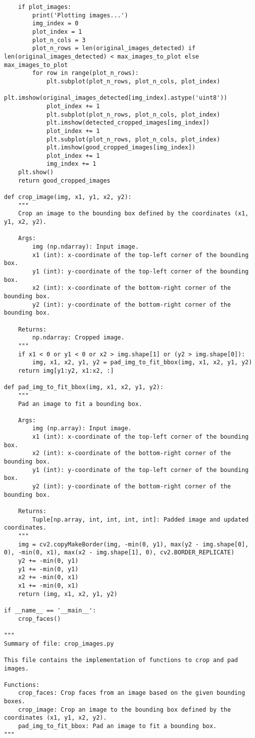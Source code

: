 \begin{verbatim}
    if plot_images:
        print('Plotting images...')
        img_index = 0
        plot_index = 1
        plot_n_cols = 3
        plot_n_rows = len(original_images_detected) if len(original_images_detected) < max_images_to_plot else max_images_to_plot
        for row in range(plot_n_rows):
            plt.subplot(plot_n_rows, plot_n_cols, plot_index)
            plt.imshow(original_images_detected[img_index].astype('uint8'))
            plot_index += 1
            plt.subplot(plot_n_rows, plot_n_cols, plot_index)
            plt.imshow(detected_cropped_images[img_index])
            plot_index += 1
            plt.subplot(plot_n_rows, plot_n_cols, plot_index)
            plt.imshow(good_cropped_images[img_index])
            plot_index += 1
            img_index += 1
    plt.show()
    return good_cropped_images

def crop_image(img, x1, y1, x2, y2):
    """
    Crop an image to the bounding box defined by the coordinates (x1, y1, x2, y2).

    Args:
        img (np.ndarray): Input image.
        x1 (int): x-coordinate of the top-left corner of the bounding box.
        y1 (int): y-coordinate of the top-left corner of the bounding box.
        x2 (int): x-coordinate of the bottom-right corner of the bounding box.
        y2 (int): y-coordinate of the bottom-right corner of the bounding box.
    
    Returns:
        np.ndarray: Cropped image.    
    """
    if x1 < 0 or y1 < 0 or x2 > img.shape[1] or (y2 > img.shape[0]):
        img, x1, x2, y1, y2 = pad_img_to_fit_bbox(img, x1, x2, y1, y2)
    return img[y1:y2, x1:x2, :]

def pad_img_to_fit_bbox(img, x1, x2, y1, y2):
    """
    Pad an image to fit a bounding box.

    Args:
        img (np.array): Input image.
        x1 (int): x-coordinate of the top-left corner of the bounding box.
        x2 (int): x-coordinate of the bottom-right corner of the bounding box.
        y1 (int): y-coordinate of the top-left corner of the bounding box.
        y2 (int): y-coordinate of the bottom-right corner of the bounding box.
    
    Returns:
        Tuple[np.array, int, int, int, int]: Padded image and updated coordinates.
    """
    img = cv2.copyMakeBorder(img, -min(0, y1), max(y2 - img.shape[0], 0), -min(0, x1), max(x2 - img.shape[1], 0), cv2.BORDER_REPLICATE)
    y2 += -min(0, y1)
    y1 += -min(0, y1)
    x2 += -min(0, x1)
    x1 += -min(0, x1)
    return (img, x1, x2, y1, y2)

if __name__ == '__main__':
    crop_faces()

"""
Summary of file: crop_images.py

This file contains the implementation of functions to crop and pad images.

Functions:
    crop_faces: Crop faces from an image based on the given bounding boxes.
    crop_image: Crop an image to the bounding box defined by the coordinates (x1, y1, x2, y2).
    pad_img_to_fit_bbox: Pad an image to fit a bounding box.
"""
\end{verbatim}


